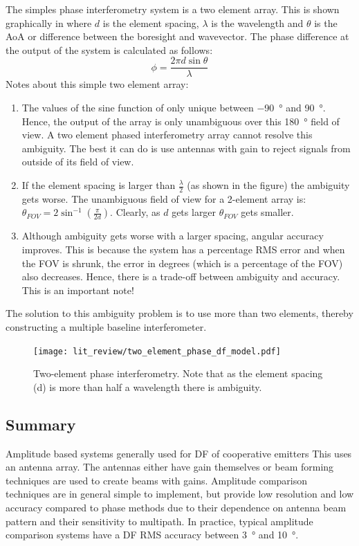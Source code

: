 The simples phase interferometry system is a two element array. This is shown graphically in  where \(d\) is the element spacing, \(\lambda\) is the wavelength and \(\theta\) is the AoA or difference between the boresight and wavevector.
The phase difference at the output of the system is calculated as follows:
\begin{equation}
\phi = \frac{2 \pi d \sin \theta}{\lambda}
\end{equation}
Notes about this simple two element array:
\begin{enumerate}
  \item The values of the sine function of only unique between \SI{-90}{\degree} and \SI{90}{\degree}. Hence, the output of the array is only unambiguous over this \SI{180}{\degree} field of view. A two element phased interferometry array cannot resolve this ambiguity. The best it can do is use antennas with gain to reject signals from outside of its field of view.
  \item If the element spacing is larger than \(\frac{\lambda}{2}\) (as shown in the figure) the ambiguity gets worse. The unambiguous field of view for a 2-element array is: \(\theta_{FOV} = 2 \sin^{-1}(\frac{\pi}{2d})\). Clearly, as \(d\) gets larger \(\theta_{FOV}\) gets smaller. 
  \item Although ambiguity gets worse with a larger spacing, angular accuracy improves. This is because the system has a percentage RMS error and when the FOV is shrunk, the error in degrees (which is a percentage of the FOV) also decreases. Hence, there is a trade-off between ambiguity and accuracy. This is an important note!
 \end{enumerate}
 The solution to this ambiguity problem is to use more than two elements, thereby constructing a multiple baseline interferometer. 

\begin{figure}
   \centering
   \texttt{[image: lit\_review/two\_element\_phase\_df\_model.pdf]}
   \caption{Two-element phase interferometry. Note that as the element spacing (d) is more than half a wavelength there is ambiguity.}
   \label{fig:lit-two-element-phase}
\end{figure}

\subsection{Summary}
Amplitude based systems generally used for DF of cooperative emitters \cite{jenkins1991smallaperture}
This uses an antenna array. The antennas either have gain themselves or beam forming techniques are used to create beams with gains. Amplitude comparison techniques are in general simple to implement, but provide low resolution and low accuracy compared to phase methods due to their dependence on antenna beam pattern and their sensitivity to multipath. In practice, typical amplitude comparison systems have a DF RMS accuracy between \SI{3}{\degree} and \SI{10}{\degree}.

